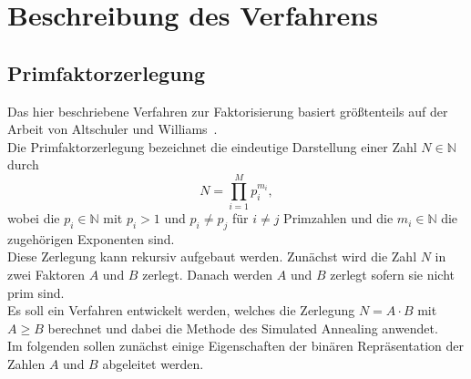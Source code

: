 \chapter{Beschreibung des Verfahrens}\label{ch:algorithm}



\section{Primfaktorzerlegung}
Das hier beschriebene Verfahren zur Faktorisierung basiert größtenteils auf der Arbeit von Altschuler und Williams~\parencite{altschuler}. \\
Die Primfaktorzerlegung bezeichnet die eindeutige Darstellung einer Zahl $N\in\mathbb{N}$ durch
\begin{equation*}
  N=\prod\limits_{i=1}^M p_i^{m_i},
\end{equation*}
wobei die $p_i\in\mathbb{N}$ mit $p_i>1$ und $p_i\neq p_j$ für $i\neq j$ Primzahlen und die $m_i\in\mathbb{N}$ die zugehörigen Exponenten sind.\\
Diese Zerlegung kann rekursiv aufgebaut werden. Zunächst wird die Zahl $N$ in zwei Faktoren $A$ und $B$ zerlegt. Danach werden $A$ und $B$ zerlegt sofern sie nicht prim sind.\\
Es soll ein Verfahren entwickelt werden, welches die Zerlegung $N=A\cdot B$ mit $A\geq B$ berechnet und dabei die Methode des Simulated Annealing anwendet.\\
Im folgenden sollen zunächst einige Eigenschaften der binären Repräsentation der Zahlen $A$ und $B$ abgeleitet werden.



